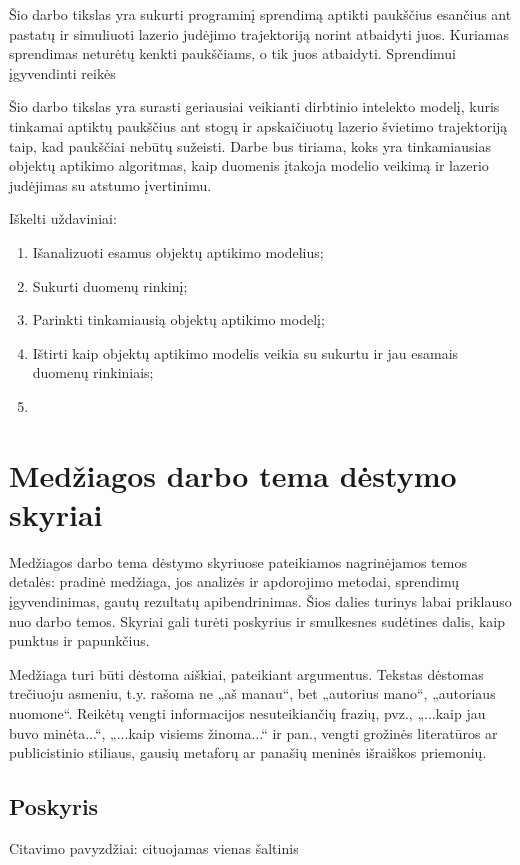 \documentclass{VUMIFPSkursinis}
\begin{document}
Šio darbo tikslas yra sukurti programinį sprendimą aptikti paukščius esančius ant pastatų ir simuliuoti lazerio judėjimo trajektoriją norint atbaidyti juos. Kuriamas sprendimas neturėtų kenkti paukščiams, o tik juos atbaidyti. Sprendimui įgyvendinti reikės 

Šio darbo tikslas yra surasti geriausiai veikianti dirbtinio intelekto modelį, kuris tinkamai aptiktų paukščius ant stogų ir apskaičiuotų lazerio švietimo trajektoriją taip, kad paukščiai nebūtų sužeisti. Darbe bus tiriama, koks yra tinkamiausias objektų aptikimo algoritmas, kaip duomenis įtakoja modelio veikimą ir lazerio judėjimas su atstumo įvertinimu.

Iškelti uždaviniai:
\begin{enumerate}
    \item Išanalizuoti esamus objektų aptikimo modelius;
    \item Sukurti duomenų rinkinį;
    \item Parinkti tinkamiausią objektų aptikimo modelį;
    \item Ištirti kaip objektų aptikimo modelis veikia su sukurtu ir jau esamais duomenų rinkiniais;
    \item 
\end{enumerate}



\section{Medžiagos darbo tema dėstymo skyriai}
Medžiagos darbo tema dėstymo skyriuose pateikiamos nagrinėjamos temos detalės:
pradinė medžiaga, jos analizės ir apdorojimo metodai, sprendimų įgyvendinimas,
gautų rezultatų apibendrinimas. Šios dalies turinys labai priklauso nuo darbo
temos. Skyriai gali turėti poskyrius ir smulkesnes sudėtines dalis, kaip
punktus ir papunkčius.

Medžiaga turi būti dėstoma aiškiai, pateikiant argumentus. Tekstas dėstomas
trečiuoju asmeniu, t.y. rašoma ne „aš manau“, bet „autorius mano“, „autoriaus
nuomone“. Reikėtų vengti informacijos nesuteikiančių frazių, pvz., „...kaip jau
buvo minėta...“, „...kaip visiems žinoma...“ ir pan., vengti grožinės literatūros
ar publicistinio stiliaus, gausių metaforų ar panašių meninės išraiškos
priemonių.

\subsection{Poskyris}
Citavimo pavyzdžiai: cituojamas vienas šaltinis
\end{document}
